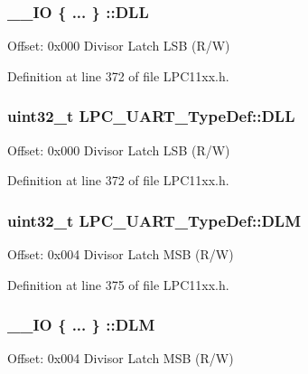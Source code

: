 \subsubsection[{\texorpdfstring{D\+LL}{DLL}}]{\setlength{\rightskip}{0pt plus 5cm}\+\_\+\+\_\+\+IO \{ ... \} \+::D\+LL}\hypertarget{group___l_p_c11xx___definitions_ga235adedd49098d09d880fa740f02dd43}{}\label{group___l_p_c11xx___definitions_ga235adedd49098d09d880fa740f02dd43}
Offset\+: 0x000 Divisor Latch L\+SB (R/W) 

Definition at line 372 of file L\+P\+C11xx.\+h.

\subsubsection[{\texorpdfstring{D\+LL}{DLL}}]{ uint32\+\_\+t L\+P\+C\+\_\+\+U\+A\+R\+T\+\_\+\+Type\+Def\+::\+D\+LL}\hypertarget{group___l_p_c11xx___definitions_ga41d5df9870fe86e6718f9a51fcc52a47}{}\label{group___l_p_c11xx___definitions_ga41d5df9870fe86e6718f9a51fcc52a47}
Offset\+: 0x000 Divisor Latch L\+SB (R/W) 

Definition at line 372 of file L\+P\+C11xx.\+h.

\subsubsection[{\texorpdfstring{D\+LM}{DLM}}]{ uint32\+\_\+t L\+P\+C\+\_\+\+U\+A\+R\+T\+\_\+\+Type\+Def\+::\+D\+LM}\hypertarget{group___l_p_c11xx___definitions_ga1bf0b08d8a70f114a9a440a88c461b11}{}\label{group___l_p_c11xx___definitions_ga1bf0b08d8a70f114a9a440a88c461b11}
Offset\+: 0x004 Divisor Latch M\+SB (R/W) 

Definition at line 375 of file L\+P\+C11xx.\+h.

\subsubsection[{\texorpdfstring{D\+LM}{DLM}}]{\setlength{\rightskip}{0pt plus 5cm}\+\_\+\+\_\+\+IO \{ ... \} \+::D\+LM}\hypertarget{group___l_p_c11xx___definitions_ga298038ea97ac8f072443c23902dffac5}{}\label{group___l_p_c11xx___definitions_ga298038ea97ac8f072443c23902dffac5}
Offset\+: 0x004 Divisor Latch M\+SB (R/W) 

